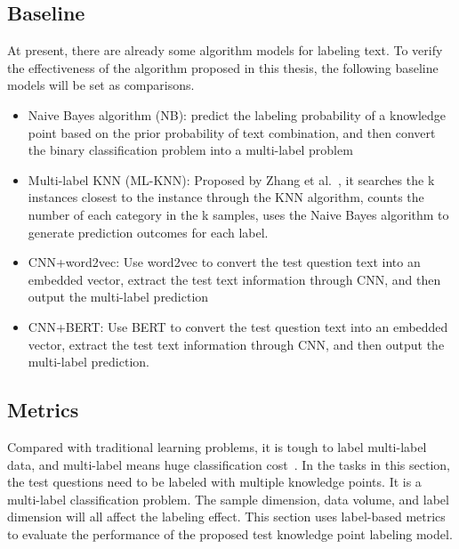 \subsection{Baseline}
At present, there are already some algorithm models for labeling text. To verify the effectiveness of the algorithm proposed in this thesis, the following baseline models will be set as comparisons.
\begin{itemize}
	\item Naive Bayes algorithm (NB): predict the labeling probability of a knowledge point based on the prior probability of text combination, and then convert the binary classification problem into a multi-label problem
	\item Multi-label KNN (ML-KNN): Proposed by Zhang et al.~\cite{zhang2007ml}, it searches the k instances closest to the instance through the KNN algorithm, counts the number of each category in the k samples, uses the Naive Bayes algorithm to generate prediction outcomes for each label.
	\item CNN+word2vec: Use word2vec to convert the test question text into an embedded vector, extract the test text information through CNN, and then output the multi-label prediction
	\item CNN+BERT\@: Use BERT to convert the test question text into an embedded vector, extract the test text information through CNN, and then output the multi-label prediction.
\end{itemize}

\subsection{Metrics}
Compared with traditional learning problems, it is tough to label multi-label data, and multi-label means huge classification cost~\cite{zhang2013review}. In the tasks in this section, the test questions need to be labeled with multiple knowledge points. It is a multi-label classification problem. The sample dimension, data volume, and label dimension will all affect the labeling effect. This section uses label-based metrics to evaluate the performance of the proposed test knowledge point labeling model.

